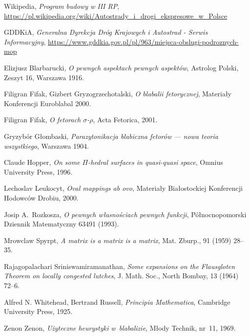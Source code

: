 \begin{thebibliography}{99}

 Wikipedia, \textit{Program budowy w III RP},\\ \url{https://pl.wikipedia.org/wiki/Autostrady\_i\_drogi\_ekspresowe\_w\_Polsce}

 GDDKiA, \textit{Generalna Dyrekcja Dróg Krajowych i Autostrad - Serwis Informacyjny}, \url{https://www.gddkia.gov.pl/pl/963/miejsca-obslugi-podroznych-mop}

 Elizjusz Blarbarucki, \textit{O pewnych
    aspektach pewnych aspektów}, Astrolog Polski, Zeszyt 16, Warszawa
  1916.

 Filigran Fifak, Gizbert Gryzogrzechotalski,
  \textit{O blabalii fetorycznej}, Materiały Konferencji Euroblabal
  2000.

 Filigran Fifak, \textit{O fetorach
    $\sigma$-$\rho$}, Acta Fetorica, 2001.

 Gryzybór Głombaski, \textit{Parazytonikacja
    blabiczna fetorów --- nowa teoria wszystkiego}, Warszawa 1904.

 Claude Hopper, \textit{On some $\Pi$-hedral
    surfaces in quasi-quasi space}, Omnius University Press, 1996.

 Lechoslav Leukocyt, \textit{Oval mappings ab ovo},
  Materiały Białostockiej Konferencji Hodowców Drobiu, 2000.

 Josip A.~Rozkosza, \textit{O pewnych własnościach
    pewnych funkcji}, Północnopomorski Dziennik Matematyczny 63491
  (1993).

 Mrowclaw Spyrpt, \textit{A matrix is a matrix
    is a matrix}, Mat. Zburp., 91 (1959) 28--35.

 Rajagopalachari Sriniswamiramanathan,
  \textit{Some expansions on the Flausgloten Theorem on locally
    congested lutches}, J. Math.  Soc., North Bombay, 13 (1964) 72--6.

 Alfred N. Whitehead, Bertrand Russell,
  \textit{Principia Mathematica}, Cambridge University Press, 1925.

 Zenon Zenon, \textit{Użyteczne heurystyki
    w~blabalizie}, Młody Technik, nr~11, 1969.

\end{thebibliography}




